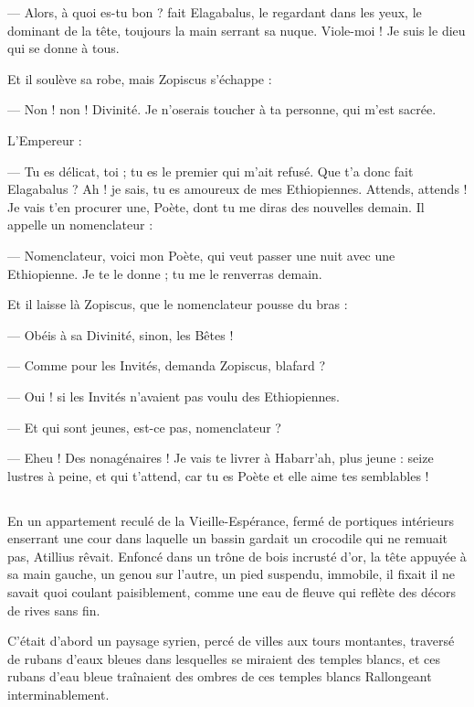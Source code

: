 \documentclass[a4paper, 11pt, oneside, polutonikogreek, french]{article}
\begin{document}
--- Alors, à quoi es-tu bon ? fait Elagabalus, le regardant dans les yeux, le dominant de la tête, toujours la main serrant sa nuque. Viole-moi ! Je suis le dieu qui se donne à tous.

Et il soulève sa robe, mais Zopiscus s'échappe :

--- Non ! non ! Divinité. Je n'oserais toucher à ta personne, qui m'est sacrée.

L'Empereur :

--- Tu es délicat, toi ; tu es le premier qui m'ait refusé. Que t'a donc fait Elagabalus ? Ah ! je sais, tu es amoureux de mes Ethiopiennes. Attends, attends ! Je vais t'en procurer une, Poète, dont tu me diras des nouvelles demain.
Il appelle un nomenclateur :

--- Nomenclateur, voici mon Poète, qui veut passer une nuit avec une Ethiopienne. Je te le donne ; tu me le renverras demain.

Et il laisse là Zopiscus, que le nomenclateur pousse du bras :

--- Obéis à sa Divinité, sinon, les Bêtes !

--- Comme pour les Invités, demanda Zopiscus, blafard ?

--- Oui ! si les Invités n'avaient pas voulu des Ethiopiennes.

--- Et qui sont jeunes, est-ce pas, nomenclateur ?

--- Eheu ! Des nonagénaires ! Je vais te livrer à Habarr'ah, plus jeune : seize lustres à peine, et qui t'attend, car tu es Poète et elle aime tes semblables !
\clearpage
\subsection{}
\paragraph{}
En un appartement reculé de la Vieille-Espérance, fermé de portiques intérieurs enserrant une cour dans laquelle un bassin gardait un crocodile qui ne remuait pas, Atillius rêvait. Enfoncé dans un trône de bois incrusté d'or, la tête appuyée à sa main gauche, un genou sur l'autre, un pied suspendu, immobile, il fixait il ne savait quoi coulant paisiblement, comme une eau de fleuve qui reflète des décors de rives sans fin.

C'était d'abord un paysage syrien, percé de villes aux tours montantes, traversé de rubans d'eaux bleues dans lesquelles se miraient des temples blancs, et ces rubans d'eau bleue traînaient des ombres de ces temples blancs Rallongeant interminablement.
\end{document}
